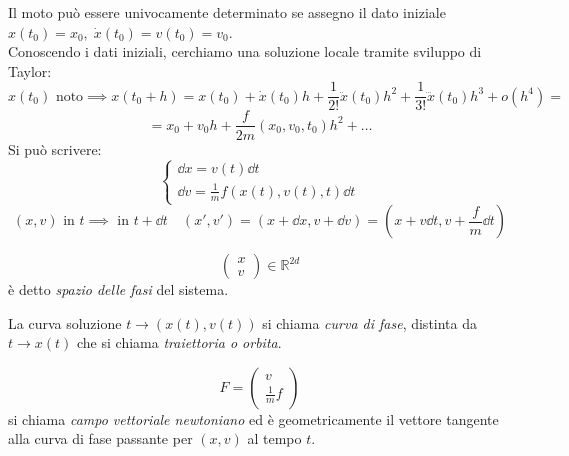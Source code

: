 Il moto può essere univocamente determinato se assegno il dato iniziale $x(t_0)=x_0,\;\dot{x}(t_0)= v(t_0)=v_0$.\\
Conoscendo i dati iniziali, cerchiamo una soluzione locale tramite sviluppo di Taylor: 
\begin{equation*}
    x(t_0) \text{ noto}\implies x(t_0+h)= x(t_0)+\dot{x}(t_0) h +\frac{1}{2!}\ddot{x}(t_0) h^2 +\frac{1}{3!}\dddot{x}(t_0)h^3  + o(h^4)= 
\end{equation*}
\begin{equation*}
   = x_0 +v_0 h + \frac{f}{2m}(x_0,v_0,t_0) h^2 + \dots
\end{equation*}
Si può scrivere:
\begin{equation}
    \begin{cases}
        \dd{x}= v(t)\dd{t}\\
        \dd{v}= \frac{1}{m}f(x(t),v(t),t)\dd{t} 
    \end{cases}
\end{equation}
\begin{equation*}
    (x,v) \text{ in } t \implies  \text{ in } t +\dd{t} \quad (x',v')= (x+\dd{x},v+\dd{v})= (x+v\dd{t},v+ \frac{f}{m}\dd{t})
\end{equation*}

\begin{definition}
    \begin{equation*}
        \begin{pmatrix}
            x\\v  
        \end{pmatrix}\in \mathbb{R}^{2d} 
    \end{equation*}
    è detto \textit{spazio delle fasi} del sistema. 
\end{definition}

\begin{definition}
    La curva soluzione $t\rightarrow(x(t),v(t))$ si chiama \textit{curva di fase}, distinta da $t\rightarrow x(t)$ che si chiama 
    \textit{traiettoria o orbita}.
\end{definition}

\begin{definition}
    \begin{equation*}
        F=\begin{pmatrix}
            v\\\frac{1}{m}f 
        \end{pmatrix}
    \end{equation*}
    si chiama \textit{campo vettoriale newtoniano} ed è geometricamente il vettore tangente alla curva di fase passante per $(x,v)$ al tempo $t$.
\end{definition}

